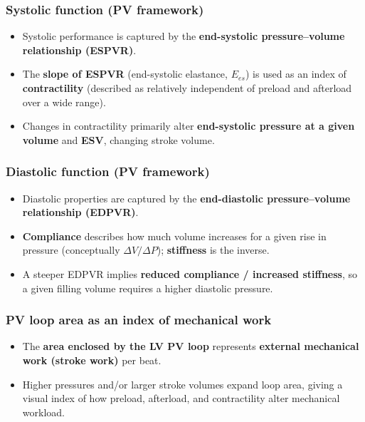 \documentclass[11pt,a4paper]{article}
\begin{document}
\subsubsection{Systolic function (PV framework)}
\begin{itemize}
\item Systolic performance is captured by the \textbf{end-systolic pressure--volume relationship (ESPVR)}.
\item The \textbf{slope of ESPVR} (end-systolic elastance, \textbf{$E_{es}$}) is used as an index of \textbf{contractility} (described as relatively independent of preload and afterload over a wide range).
\item Changes in contractility primarily alter \textbf{end-systolic pressure at a given volume} and \textbf{ESV}, changing stroke volume.
\end{itemize}

\subsubsection{Diastolic function (PV framework)}
\begin{itemize}
\item Diastolic properties are captured by the \textbf{end-diastolic pressure--volume relationship (EDPVR)}.
\item \textbf{Compliance} describes how much volume increases for a given rise in pressure (conceptually $\Delta V/\Delta P$); \textbf{stiffness} is the inverse.
\item A steeper EDPVR implies \textbf{reduced compliance / increased stiffness}, so a given filling volume requires a higher diastolic pressure.
\end{itemize}

\subsubsection{PV loop area as an index of mechanical work}
\begin{itemize}
\item The \textbf{area enclosed by the LV PV loop} represents \textbf{external mechanical work (stroke work)} per beat.
\item Higher pressures and/or larger stroke volumes expand loop area, giving a visual index of how preload, afterload, and contractility alter mechanical workload.
\end{itemize}
\end{document}
